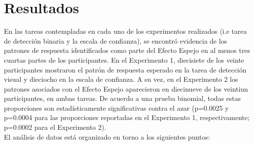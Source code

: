
\chapter{Resultados} %

\label{Cap_Res} %

En las tareas contempladas en cada uno de los experimentos realizados (i.e tarea de detección binaria y la escala de confianza), se encontró evidencia de los patrones de respuesta identificados como parte del Efecto Espejo en al menos tres cuartas partes de los participantes. En el Experimento 1, diecisiete de los veinte participantes mostraron el patrón de respuesta esperado en la tarea de detección visual y dieciocho en la escala de confianza. A su vez, en el Experimento 2 los patrones asociados con el Efecto Espejo aparecieron en diecinueve de los veintiun participantes, en ambas tareas. De acuerdo a una prueba binomial, todas estas proporciones son estadísticamente significativas contra el azar (p=0.0025 y p=0.0004 para las proporciones reportadas en el Experimento 1, respectivamente; p=0.0002 para el Experimento 2).\\

El análisis de datos está organizado en torno a los siguientes puntos:

